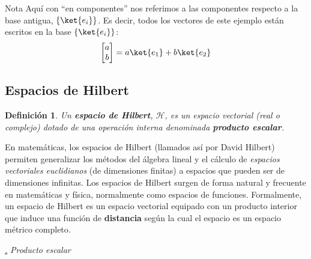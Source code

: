 \documentclass[a4paper,11pt]{book} %
\newtheorem{definicion_contador}{Definición}
\newcommand{\Definicion}[1]{
		\begin{mybox_gray2}{}
			\begin{definicion_contador}
				 #1 
			\end{definicion_contador} 
		\end{mybox_gray2}
	}
\numberwithin{equation}{chapter}
\def\subsubiContadorIt{\par\addtocounter{subsubsection}{1}\underline{\it\thesubsubsection.}\hskip0.5cm \setcounter{subsubsubsectionIt}{0}}
\newcommand{\SubsubiIt}[1]{
		\subsubiContadorIt \textit{#1}
	}
\newcounter{subsubsubsectionIt}[subsubsection]
\begin{document}
\begin{mybox_blue}{Nota}
Aquí con ``en componentes'' nos referimos a las componentes respecto a la base antigua, $\{\ket{e_i}\}$. Es decir, todos los vectores de este ejemplo están escritos en la base $\{\ket{e_i}\}$:
\begin{equation}
\begin{bmatrix}
a \\b
\end{bmatrix} = a \ket{e_1} + b \ket{e_2}
\end{equation}
\end{mybox_blue}



		\subsection{Espacios de Hilbert}

	\Definicion{
	Un \textbf{espacio de Hilbert}, $\mathcal{H}$, es un espacio vectorial (real o complejo) dotado de una operación interna denominada \textbf{producto escalar}.
	}

En matemáticas, los espacios de Hilbert (llamados así por David Hilbert) permiten generalizar los métodos del álgebra lineal y el cálculo de \textit{espacios vectoriales euclidianos} (de dimensiones finitas) a espacios que pueden ser de dimensiones infinitas. Los espacios de Hilbert surgen de forma natural y frecuente en matemáticas y física, normalmente como espacios de funciones. Formalmente, un espacio de Hilbert es un espacio vectorial equipado con un producto interior que induce una función de \textbf{distancia} según la cual el espacio es un espacio métrico completo.

			\SubsubiIt{Producto escalar}
			
\end{document}
